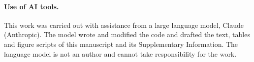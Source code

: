 \paragraph{Use of AI tools.} This work was carried out with assistance from a
large language model, Claude (Anthropic). The model wrote and modified
the code and drafted the text, tables and figure scripts of this manuscript and its Supplementary Information. The language model is not an author and cannot
take responsibility for the work.